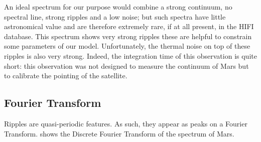 An ideal spectrum for our purpose would combine a strong continuum, no spectral line, strong ripples and a low noise; but such spectra have little astronomical value and are therefore extremely rare, if at all present, in the HIFI database.
This spectrum shows very strong ripples these are helpful to constrain some parameters of our model.
Unfortunately, the thermal noise on top of these ripples is also very strong.
Indeed, the integration time of this observation is quite short: this observation was not designed to measure the continuum of Mars but to calibrate the pointing of the satellite.





\subsection{Fourier Transform}
Ripples are quasi-periodic features.
As such, they appear as peaks on a Fourier Transform.
 shows the Discrete Fourier Transform of the spectrum of Mars.

